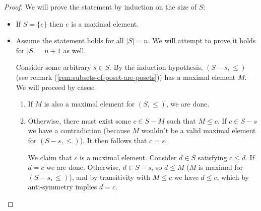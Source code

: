  \begin{proof}
  We will prove the statement by induction on the size of $S$:
  \begin{itemize}
    \item If $S = \{e\}$ then $e$ is a maximal element.
    \item Assume the statement holds for all $|S| = n$. We will attempt to prove it holds for $|S| = n + 1$ as well. 

      Consider some arbitrary $s \in S$. By the induction hypothesis, $(S - s, \leq)$ (see remark (\ref{rem:subsets-of-poset-are-posets})) has a maximal element $M$. We will proceed by cases:
      \begin{enumerate}
        \item If $M$ is also a maximal element for $(S, \leq)$, we are done.
        \item Otherwise, there must exist some $c \in S - M$ such that $M \leq  c$. If $c \in S - s$ we have a contradiction (because $M$ wouldn't be a valid maximal element for $(S - s, \leq )$). It then follows that $c = s$. 

          We claim that $c$ is a maximal element. Consider $d \in S$ satisfying $c \leq d$. If $d = c$ we are done. Otherwise, $d \in S - s$, so $d \leq M$ ($M$ is maximal for $(S - s, \leq )$), and by transitivity with $M \leq c$ we have $d \leq c$, which by anti-symmetry implies $d = c$.
      \end{enumerate}
  \end{itemize}
 \end{proof}
